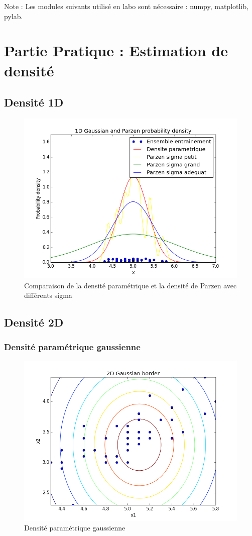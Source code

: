 \documentclass[a4paper,10pt]{article}
\begin{document}
Note : Les modules suivants utilisé en labo sont nécessaire : numpy, matplotlib, pylab.


\section{Partie Pratique : Estimation de densité}

\subsection{Densité 1D}

\begin{figure}[H]
	\includegraphics[width=12cm]{images/1D_Gaussian_and_Parzen_probability_density.png} 
	\centering
	\caption{Comparaison de la densité paramétrique et la densité de Parzen avec différents sigma}
	\label{fig:comp}
\end{figure}

\subsection{Densité 2D}

\subsubsection{Densité paramétrique gaussienne}
\begin{figure}[H]
	\includegraphics[width=12cm]{images/2D_Gaussian_border.png} 
	\centering
	\caption{Densité paramétrique gaussienne}
	\label{fig:comp}
\end{figure}
\end{document}
